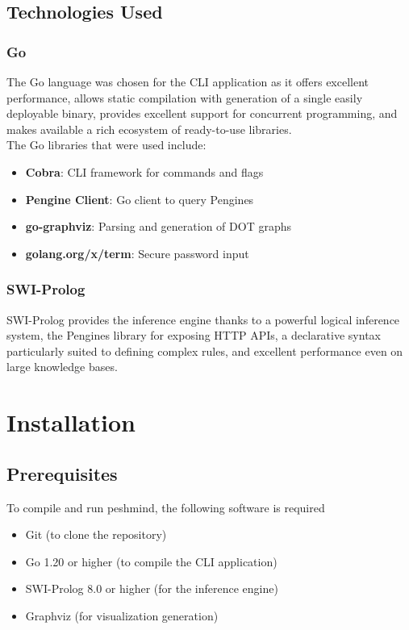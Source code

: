 \documentclass[12pt,a4paper]{article}
\begin{document}
\subsection{Technologies Used}

\subsubsection{Go}

The Go language was chosen for the CLI application as it offers excellent performance,
 allows static compilation with generation of a single easily deployable binary, 
 provides excellent support for concurrent programming, and makes available a rich
  ecosystem of ready-to-use libraries. \\
The Go libraries that were used include:
\begin{itemize}
    \item \textbf{Cobra}: CLI framework for commands and flags
    \item \textbf{Pengine Client}: Go client to query Pengines
    \item \textbf{go-graphviz}: Parsing and generation of DOT graphs
    \item \textbf{golang.org/x/term}: Secure password input
\end{itemize}
\subsubsection{SWI-Prolog}

SWI-Prolog provides the inference engine thanks to a powerful logical inference system, the 
Pengines library for exposing HTTP APIs, a declarative syntax particularly suited to 
defining complex rules, and excellent performance even on large knowledge bases.

\section{Installation}
\subsection{Prerequisites}

To compile and run peshmind, the following software is required

\begin{itemize}
    \item Git (to clone the repository)
    \item Go 1.20 or higher (to compile the CLI application)
    \item SWI-Prolog 8.0 or higher (for the inference engine)
    \item Graphviz (for visualization generation)
\end{itemize}
\end{document}
